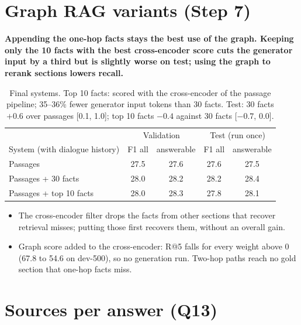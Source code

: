 \documentclass[11pt,a4paper]{article}
\begin{document}
\section{Graph RAG variants (Step 7)}\label{sec:graphrag}

\textbf{Appending the one-hop facts stays the best use of the graph. Keeping only the 10 facts
with the best cross-encoder score cuts the generator input by a third but is slightly worse on test; using the
graph to rerank sections lowers recall.}

\begin{table}[H]
\centering\small
\begin{tabular}{lcccc}
\toprule
 & \multicolumn{2}{c}{Validation} & \multicolumn{2}{c}{Test (run once)} \\
System (with dialogue history) & F1 all & answerable & F1 all & answerable \\
\midrule
Passages & 27.5 & 27.6 & 27.6 & 27.5 \\
Passages + 30 facts & 28.0 & 28.2 & 28.2 & 28.4 \\
Passages + top 10 facts & 28.0 & 28.3 & 27.8 & 28.1 \\
\bottomrule
\end{tabular}
\caption{Final systems. Top 10 facts: scored with the cross-encoder of the passage pipeline;
35--36\% fewer generator input tokens than 30 facts. Test: 30 facts $+0.6$ over passages
[0.1, 1.0]; top 10 facts $-0.4$ against 30 facts [$-0.7$, 0.0].}
\label{tab:graphrag}
\end{table}

\begin{itemize}
\item The cross-encoder filter drops the facts from other sections that recover retrieval misses;
  putting those first recovers them, without an overall gain.
\item Graph score added to the cross-encoder: R@5 falls for every weight above 0 (67.8 to 54.6 on
  dev-500), so no generation run. Two-hop paths reach no gold section that one-hop facts miss.
\end{itemize}

\section{Sources per answer (Q13)}\label{sec:sources}
\end{document}
